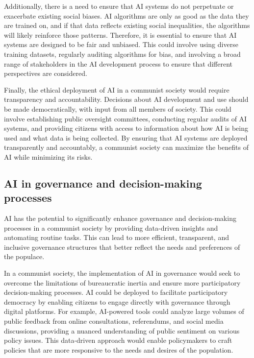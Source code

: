 Additionally, there is a need to ensure that AI systems do not perpetuate or exacerbate existing social biases. AI algorithms are only as good as the data they are trained on, and if that data reflects existing social inequalities, the algorithms will likely reinforce those patterns. Therefore, it is essential to ensure that AI systems are designed to be fair and unbiased. This could involve using diverse training datasets, regularly auditing algorithms for bias, and involving a broad range of stakeholders in the AI development process to ensure that different perspectives are considered.

Finally, the ethical deployment of AI in a communist society would require transparency and accountability. Decisions about AI development and use should be made democratically, with input from all members of society. This could involve establishing public oversight committees, conducting regular audits of AI systems, and providing citizens with access to information about how AI is being used and what data is being collected. By ensuring that AI systems are deployed transparently and accountably, a communist society can maximize the benefits of AI while minimizing its risks.

\subsection{AI in governance and decision-making processes}

AI has the potential to significantly enhance governance and decision-making processes in a communist society by providing data-driven insights and automating routine tasks. This can lead to more efficient, transparent, and inclusive governance structures that better reflect the needs and preferences of the populace.

In a communist society, the implementation of AI in governance would seek to overcome the limitations of bureaucratic inertia and ensure more participatory decision-making processes. AI could be deployed to facilitate participatory democracy by enabling citizens to engage directly with governance through digital platforms. For example, AI-powered tools could analyze large volumes of public feedback from online consultations, referendums, and social media discussions, providing a nuanced understanding of public sentiment on various policy issues. This data-driven approach would enable policymakers to craft policies that are more responsive to the needs and desires of the population.

